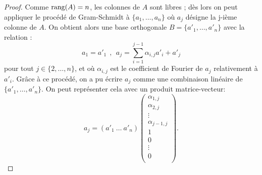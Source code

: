 \begin{proof}
Comme $\operatorname{rang}(A) = n$, les colonnes de $A$ sont libres ; dès lors on peut appliquer le procédé de Gram-Schmidt à $\{a_1, \dots , a_n \} $ où $a_j$ désigne la j-ième colonne de $A$. On obtient alors une base orthogonale $B=  \{a'_1, \dots , a'_n\}$ avec la relation :
\begin{displaymath}
a_1=a'_1
~~,~~
a_j = \sum_{i=1}^{j-1} \alpha_{i,j} a'_i +a'_j
\end{displaymath}
pour tout $j \in \{2, \dots,n\}$, et où $\alpha_{i,j} $ est le coefficient de Fourier de $a_j$ relativement à $a'_i$.
Grâce à ce procédé, on a pu écrire $a_j$ comme une combinaison linéaire de $\{a'_1, \dots , a'_n\} $. On peut représenter cela avec un produit matrice-vecteur:
\begin{displaymath}
a_j= (a'_1 ~ \dots ~ a'_n)
\begin{pmatrix}
\alpha_{1,j}\\\alpha_{2,j}\\\vdots\\\alpha_{j-1,j}\\1\\0\\\vdots\\0\\
\end{pmatrix}.  
\end{displaymath}


\end{proof}
